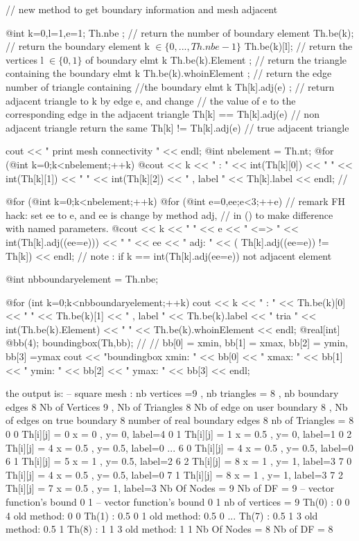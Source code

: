 \documentclass[a4paper,twoside,12pt]{book}
\def\n{\nabla}
\begin{document}
{  // new method to get boundary information and mesh adjacent  

 @int k=0,l=1,e=1;
  Th.nbe ; // return the number of boundary element  \hfilll
  Th.be(k);   // return the boundary element k $\in \{0,...,Th.nbe-1\}$   \hfilll
  Th.be(k)[l];   // return the vertices l $\in \{0,1\}$ of  boundary elmt k \hfilll
  Th.be(k).Element ;   // return the triangle containing the  boundary elmt k \hfilll
  Th.be(k).whoinElement ;   // return the edge number of triangle containing \hfilll
  //the  boundary elmt k
  Th[k].adj(e) ; // return adjacent triangle to k by edge e, and change \hfill
  // the value of e to the corresponding edge in the adjacent triangle
  Th[k] == Th[k].adj(e) // non adjacent triangle return the same
  Th[k] != Th[k].adj(e) // true adjacent triangle

  cout << " print mesh connectivity " << endl;
  @int nbelement = Th.nt;
  @for (@int k=0;k<nbelement;++k)
    @cout << k << " :  " << int(Th[k][0]) << " " << int(Th[k][1])
         << " " <<  int(Th[k][2])
         << " , label  " << Th[k].label << endl;
  //

  @for (@int k=0;k<nbelement;++k)
    @for (@int e=0,ee;e<3;++e)
      //  remark FH hack:  set ee to e, and ee is change by method adj,
      //  in () to make difference with  named parameters.
	    @cout << k <<  " " << e << " <=>  " << int(Th[k].adj((ee=e))) << " " << ee
	     << "  adj: " << ( Th[k].adj((ee=e)) != Th[k]) << endl;
      // note :     if k == int(Th[k].adj(ee=e)) not adjacent element


  @int nbboundaryelement = Th.nbe;

  @for (int k=0;k<nbboundaryelement;++k)
      cout << k << " : " <<  Th.be(k)[0] << " " << Th.be(k)[1] << " , label "
           << Th.be(k).label <<  " tria  " << int(Th.be(k).Element)
           << " " << Th.be(k).whoinElement <<  endl;
  @real[int] @bb(4);
  boundingbox(Th,bb); //    
  // bb[0] = xmin, bb[1] = xmax, bb[2] = ymin, bb[3] =ymax 
  cout << "\n boundingbox  xmin: " << bb[0] << " xmax: " << bb[1] 
                    << " ymin: " << bb[2] << " ymax: " << bb[3] << endl; 
}
\eFF
the output is:
\bFF
 -- square mesh : nb vertices  =9 ,  nb triangles = 8 ,  nb boundary edges 8
    Nb of Vertices 9 ,  Nb of Triangles 8
    Nb of edge on user boundary  8 ,  Nb of edges on true boundary  8
 number of real boundary edges 8
 nb of Triangles = 8
0 0 Th[i][j] = 0  x = 0 , y= 0,  label=4
0 1 Th[i][j] = 1  x = 0.5 , y= 0,  label=1
0 2 Th[i][j] = 4  x = 0.5 , y= 0.5,  label=0
...
6 0 Th[i][j] = 4  x = 0.5 , y= 0.5,  label=0
6 1 Th[i][j] = 5  x = 1 , y= 0.5,  label=2
6 2 Th[i][j] = 8  x = 1 , y= 1,  label=3
7 0 Th[i][j] = 4  x = 0.5 , y= 0.5,  label=0
7 1 Th[i][j] = 8  x = 1 , y= 1,  label=3
7 2 Th[i][j] = 7  x = 0.5 , y= 1,  label=3
 Nb Of Nodes = 9
 Nb of DF = 9
 -- vector function's bound  0 1
 -- vector function's bound  0 1
 nb of vertices = 9
Th(0) : 0 0 4       old method: 0 0
Th(1) : 0.5 0 1       old method: 0.5 0
...
Th(7) : 0.5 1 3       old method: 0.5 1
Th(8) : 1 1 3       old method: 1 1
 Nb Of Nodes = 8
 Nb of DF = 8
\end{document}
